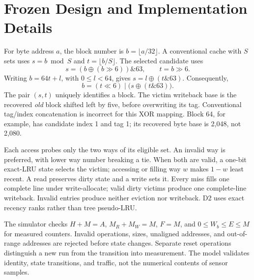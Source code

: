 \documentclass[11pt,a4paper]{article}
\begin{document}
\clearpage



\clearpage
\appendix
\section{Frozen Design and Implementation Details}\label{app:design}
For byte address $a$, the block number is $b=\lfloor a/32\rfloor$. A conventional cache with $S$ sets uses $s=b\bmod S$ and $t=\lfloor b/S\rfloor$. The selected candidate uses
\begin{equation}
s=(b\oplus(b\gg6))\mathbin{\&}63,\qquad t=b\gg6.
\end{equation}
Writing $b=64t+l$, with $0\le l<64$, gives $s=l\oplus(t\mathbin{\&}63)$. Consequently,
\begin{equation}
b=(t\ll6)\mathbin{|}\bigl(s\oplus(t\mathbin{\&}63)\bigr).
\end{equation}
The pair $(s,t)$ uniquely identifies a block. The victim writeback base is the recovered \emph{old} block shifted left by five, before overwriting its tag. Conventional tag/index concatenation is incorrect for this XOR mapping. Block 64, for example, has candidate index 1 and tag 1; its recovered byte base is 2,048, not 2,080.

Each access probes only the two ways of its eligible set. An invalid way is preferred, with lower way number breaking a tie. When both are valid, a one-bit exact-LRU state selects the victim; accessing or filling way $w$ makes $1-w$ least recent. A read preserves dirty state and a write sets it. Every miss fills one complete line under write-allocate; valid dirty victims produce one complete-line writeback. Invalid entries produce neither eviction nor writeback. D2 uses exact recency ranks rather than tree pseudo-LRU.

The simulator checks $H+M=A$, $M_R+M_W=M$, $F=M$, and $0\le W_b\le E\le M$ for measured counters. Invalid operations, sizes, unaligned addresses, and out-of-range addresses are rejected before state changes. Separate reset operations distinguish a new run from the transition into measurement. The model validates identity, state transitions, and traffic, not the numerical contents of sensor samples.
\end{document}
